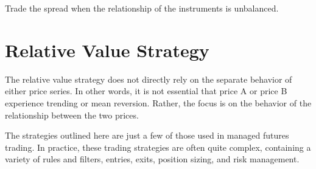 \documentclass[11pt]{article}
\begin{document}
Trade the spread when the relationship of the instruments is unbalanced.

\section*{Relative Value Strategy}
The relative value strategy does not directly rely on the separate behavior of either price series. In other words, it is not essential that price A or price B experience trending or mean reversion. Rather, the focus is on the behavior of the relationship between the two prices.

The strategies outlined here are just a few of those used in managed futures trading. In practice, these trading strategies are often quite complex, containing a variety of rules and filters, entries, exits, position sizing, and risk management.
\end{document}
